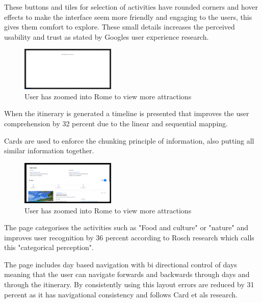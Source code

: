 \documentclass[]{project_final}
\begin{document}
These buttons and tiles for selection of activities have rounded corners and hover effects to make the interface seem more friendly and engaging to the users, this gives them comfort to explore. These small details increases the perceived usability and trust as stated by Googles user experience research.

\begin{figure}[ht!]
    \centering
    \includegraphics[width=0.4\textwidth]{loading screen.png}
    \caption{User has zoomed into Rome to view more attractions}
    \label{fig:1}
\end{figure}

When the itinerary is generated a timeline is presented that improves the user comprehension by 32 percent due to the linear and sequential mapping.

Cards are used to enforce the chunking principle of information, also putting all similar information together.


\begin{figure}[ht!]
    \centering
    \includegraphics[width=0.4\textwidth]{itin1.png}
    \caption{User has zoomed into Rome to view more attractions}
    \label{fig:1}
\end{figure}

The page categorises the activities such as "Food and culture" or "nature" and improves user recognition by 36 percent according to Rosch research which calls this "categorical perception".

The page includes day based navigation with bi directional control of days meaning that the user can navigate forwards and backwards through days and through the itinerary.
By consistently using this layout errors are reduced by 31 percent as it has navigational consistency and follows Card et als research.
\end{document}
